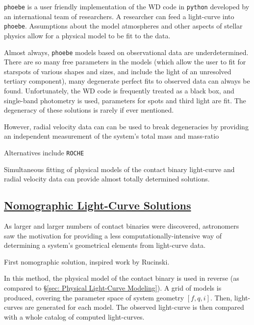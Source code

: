 \documentclass[12pt]{article} %
\numberwithin{equation}{section} %
\begin{document}
\texttt{phoebe} is a user friendly implementation of the WD code in \texttt{python} developed by an international team of researchers. A researcher can feed a light-curve into \texttt{phoebe}. Assumptions about the model atmospheres and other aspects of stellar physics allow for a physical model to be fit to the data.

Almost always, \texttt{phoebe} models based on observational data are underdetermined. There are so many free parameters in the models (which allow the user to fit for starspots of various shapes and sizes, and include the light of an unresolved tertiary component), many degenerate perfect fits to observed data can always be found. Unfortunately, the WD code is frequently treated as a black box, and single-band photometry is used, parameters for spots and third light are fit. The degeneracy of these solutions is rarely if ever mentioned. 

However, radial velocity data can can be used to break degeneracies by providing an independent measurement of the system's total mass and mass-ratio 

Alternatives include \texttt{ROCHE}  \citep{pribulla2012roche}

Simultaneous fitting of physical models of the contact binary light-curve and radial velocity data can provide almost totally determined solutions. 

\subsection[Nomographic Light-Curve Solutions]{\hyperlink{toc}{Nomographic Light-Curve Solutions}} \label{sec: Nomographic Light-Curve Solutions}

As larger and larger numbers of contact binaries were discovered, astronomers saw the motivation for providing a less computationally-intensive way of determining a system's geometrical elements from light-curve data.

\citet{mochnacki1972model} First nomographic solution, inspired work by Rucinski. \citep{rucinski1973w}

In this method, the physical model of the contact binary is used in reverse (as compared to \S\ref{sec: Physical Light-Curve Modeling}). A grid of models is produced, covering the parameter space of system geometry $[f,q,i]$. Then, light-curves are generated for each model. The observed light-curve is then compared with a whole catalog of computed light-curves. 
\end{document}

